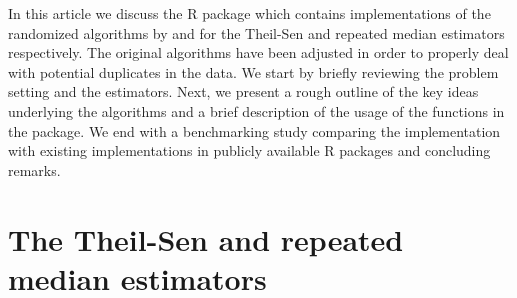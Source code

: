 In this article we discuss the R package  \citep{R:robslopes} which contains implementations of the randomized algorithms by \citet{matouvsek1991randomized} and \citet{matouvsek1998efficient} for the Theil-Sen and repeated median estimators respectively. The original algorithms have been adjusted in order to properly deal with potential duplicates in the data. We start by briefly reviewing the problem setting and the estimators. Next, we present a rough outline of the key ideas underlying the algorithms and a brief description of the usage of the functions in the package. We end with a benchmarking study comparing the implementation with existing implementations in publicly available R packages and concluding remarks.


\section{The Theil-Sen and repeated median estimators}\label{sec:meth}


